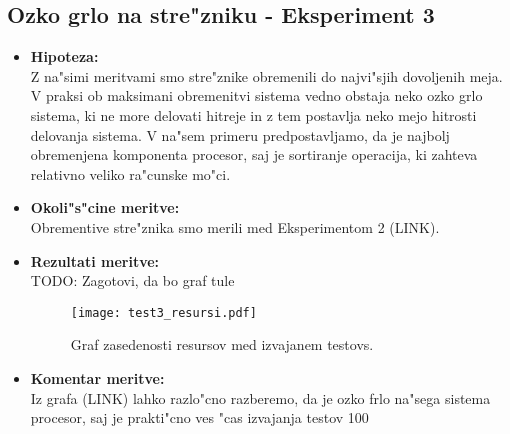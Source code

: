 \subsection{Ozko grlo na stre"zniku - Eksperiment 3}
\begin{itemize}
	\item \textbf{Hipoteza: }  \\
		Z na"simi meritvami smo stre"znike obremenili do najvi"sjih dovoljenih meja. V praksi ob maksimani obremenitvi sistema vedno obstaja neko ozko grlo sistema, ki ne more delovati hitreje in z tem postavlja neko mejo hitrosti delovanja sistema. V na"sem primeru predpostavljamo, da je najbolj obremenjena komponenta procesor, saj je sortiranje operacija, ki zahteva relativno veliko ra"cunske mo"ci. 
			
	\item \textbf{Okoli"s"cine meritve: } \\
		Obrementive stre"znika smo merili med Eksperimentom 2 (LINK). 

 	\item \textbf{Rezultati meritve: }  \\
	TODO: Zagotovi, da bo graf tule
		\begin{figure}[!htb]
  		\centering
  		  \texttt{[image: test3\_resursi.pdf]}
  		\caption{Graf zasedenosti resursov med izvajanem testovs.}
  		\label{8_graf_zasedenost_resursov}
		\end{figure}


	\item \textbf{Komentar meritve: } \\ 
		Iz grafa (LINK) lahko razlo"cno razberemo, da je ozko frlo na"sega sistema procesor, saj je prakti"cno ves "cas izvajanja testov 100%


\end{itemize}

